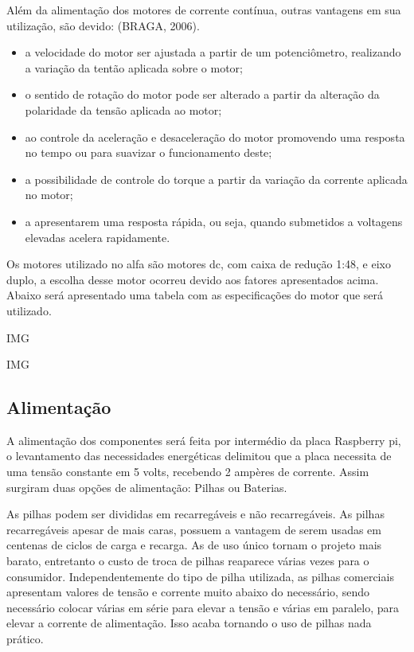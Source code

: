 Além da alimentação dos motores de corrente contínua, outras vantagens em sua utilização, são devido: (BRAGA, 2006).
\begin{itemize}
\item a velocidade do motor ser ajustada a partir de um potenciômetro, realizando a variação da tentão aplicada sobre o motor;
\item o sentido de rotação do motor pode ser alterado a partir da alteração da polaridade da tensão aplicada ao motor;
\item ao controle da aceleração e desaceleração do motor promovendo uma resposta no tempo ou para suavizar o funcionamento deste;
\item a possibilidade de controle do torque a partir da variação da corrente aplicada no motor;
\item a apresentarem uma resposta rápida, ou seja, quando submetidos a voltagens elevadas acelera rapidamente.
\end{itemize}

Os motores utilizado no alfa são motores dc, com caixa de redução 1:48, e eixo duplo, a escolha desse motor ocorreu devido aos fatores apresentados acima. Abaixo será apresentado uma tabela com as especificações do motor que será utilizado.

IMG

IMG

\subsection{Alimentação}

A alimentação dos componentes será feita por intermédio da placa Raspberry pi, o levantamento das necessidades energéticas delimitou que a placa necessita de uma tensão constante em 5 volts, recebendo 2 ampères de corrente.  Assim surgiram duas opções de alimentação: Pilhas ou Baterias.

As pilhas podem ser divididas em recarregáveis e não recarregáveis. As pilhas recarregáveis apesar de mais caras, possuem a vantagem de serem usadas em centenas de ciclos de carga e recarga. As de uso único tornam o projeto mais barato, entretanto o custo de troca de pilhas reaparece várias vezes para o consumidor. Independentemente do tipo de pilha utilizada, as pilhas comerciais apresentam valores de tensão e corrente muito abaixo do necessário, sendo necessário colocar várias em série para elevar a tensão e várias em paralelo, para elevar a corrente de alimentação. Isso acaba tornando o uso de pilhas nada prático.

